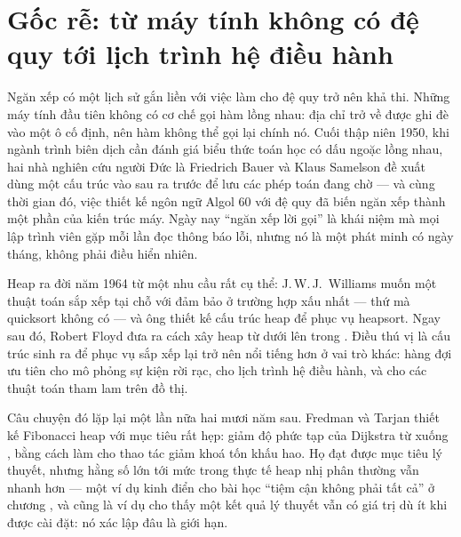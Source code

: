 \documentclass[../../algorithm.tex]{subfiles}
\begin{document}
\section{Gốc rễ: từ máy tính không có đệ quy tới lịch trình hệ điều hành}

Ngăn xếp có một lịch sử gắn liền với việc làm cho đệ quy trở nên khả thi. Những máy tính đầu tiên không có cơ chế gọi hàm lồng nhau: địa chỉ trở về được ghi đè vào một ô cố định, nên hàm không thể gọi lại chính nó. Cuối thập niên 1950, khi ngành trình biên dịch cần đánh giá biểu thức toán học có dấu ngoặc lồng nhau, hai nhà nghiên cứu người Đức là Friedrich Bauer và Klaus Samelson đề xuất dùng một cấu trúc vào sau ra trước để lưu các phép toán đang chờ --- và cùng thời gian đó, việc thiết kế ngôn ngữ Algol 60 với đệ quy đã biến ngăn xếp thành một phần của kiến trúc máy. Ngày nay ``ngăn xếp lời gọi'' là khái niệm mà mọi lập trình viên gặp mỗi lần đọc thông báo lỗi, nhưng nó là một phát minh có ngày tháng, không phải điều hiển nhiên.

Heap ra đời năm 1964 từ một nhu cầu rất cụ thể: J.\,W.\,J.\ Williams muốn một thuật toán sắp xếp tại chỗ với đảm bảo  ở trường hợp xấu nhất --- thứ mà quicksort không có --- và ông thiết kế cấu trúc heap để phục vụ heapsort. Ngay sau đó, Robert Floyd đưa ra cách xây heap từ dưới lên trong . Điều thú vị là cấu trúc sinh ra để phục vụ sắp xếp lại trở nên nổi tiếng hơn ở vai trò khác: hàng đợi ưu tiên cho mô phỏng sự kiện rời rạc, cho lịch trình hệ điều hành, và cho các thuật toán tham lam trên đồ thị.

Câu chuyện đó lặp lại một lần nữa hai mươi năm sau. Fredman và Tarjan thiết kế Fibonacci heap\cite{fredman1987} với mục tiêu rất hẹp: giảm độ phức tạp của Dijkstra từ  xuống , bằng cách làm cho thao tác giảm khoá tốn  khấu hao. Họ đạt được mục tiêu lý thuyết, nhưng hằng số lớn tới mức trong thực tế heap nhị phân thường vẫn nhanh hơn --- một ví dụ kinh điển cho bài học ``tiệm cận không phải tất cả'' ở chương , và cũng là ví dụ cho thấy một kết quả lý thuyết vẫn có giá trị dù ít khi được cài đặt: nó xác lập đâu là giới hạn.

\begin{gocre}
\end{gocre}
\end{document}
